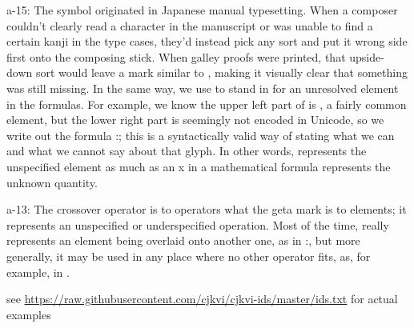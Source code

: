 \begin{multicols}{2}
{\mktsStyleBold{}a-15}: The symbol \cjkgGlue{} originated in Japanese manual typesetting. When a composer
couldn’t clearly read a character in the manuscript or was unable to find
a certain kanji in the type cases, they’d instead pick any sort and
put it wrong side first onto the composing stick. When galley proofs were
printed, that upside-down sort would leave a mark similar to \cjkgGlue{}, making it
visually clear that something was still missing. In the same way, we
use \cjkgGlue{} to stand in for an unresolved element in the formulas. For
example, we know the upper left part of \cjkgGlue{} is \cjkgGlue{}, a fairly common element,
but the lower right part is seemingly not encoded in Unicode, so we write
out the formula \cjkgGlue{}:\cjkgGlue{}\cjkgGlue{}; this is a syntactically valid way of stating what
we can and what we cannot say about that glyph. In other words,
\cjkgGlue{} represents the unspecified element as much as an {\mktsStyleItalic{}x\/} in a mathematical
formula represents the unknown quantity.

{\mktsStyleBold{}a-13}: The crossover operator \cjkgGlue{} is to operators what the geta mark
\cjkgGlue{} is to elements; it represents an unspecified or underspecified operation. Most of
the time, \cjkgGlue{} really represents an element being overlaid onto another
one, as in \cjkgGlue{}:\cjkgGlue{}\cjkgGlue{}, but more generally, it may be used in any place
where no other operator fits, as, for example, in \cjkgGlue{}.



\begin{mktsEnNotes}{\mktsEnStyleMarkNotes{}\mktsEnMarkAfter{}}see
\url{https://raw.githubusercontent.com/cjkvi/cjkvi-ids/master/ids.txt} for actual examples


\end{mktsEnNotes}
\end{multicols}
